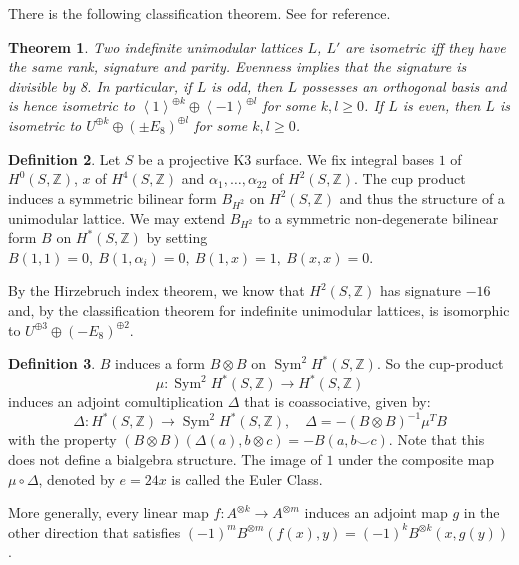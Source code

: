 \documentclass{amsart}
\DeclareMathOperator{\Sym}{Sym}
\newcommand{\One}{1}
\newcommand{\IZ}{\mathbb{Z}}
\theoremstyle{plain}
\newtheorem{theorem}{Theorem}[section]
\theoremstyle{definition}
\newtheorem{definition}[theorem]{Definition}
\theoremstyle{remark}
\begin{document}
There is the following classification theorem. See \cite[Chap. II]{milnor1973symmetric} for reference.
\begin{theorem}
Two indefinite unimodular lattices $L$, $L'$ are isometric iff they have the same rank, signature and parity. Evenness implies that the signature is divisible by 8. 
In particular, if $L$ is odd, then $L$ possesses an orthogonal basis and is hence isometric to $\left<1\right>^{\oplus k}\oplus\left<-1\right>^{\oplus l}$ for some $k,l\geq 0$. If $L$ is even, then $L$ is isometric to $U^{\oplus k}\oplus (\pm E_8)^{\oplus l}$ for some $k,l\geq 0$.
\end{theorem}
\begin{definition}
Let $S$ be a projective K3 surface. We fix integral bases $\One$ of $H^0(S,\IZ)$, $x$ of $H^4(S,\IZ)$ and $\alpha_1,\ldots ,\alpha_{22}$ of $H^2(S,\IZ)$. The cup product induces a symmetric bilinear form $B_{H^2}$ on $H^2(S,\IZ)$ and thus the structure of a unimodular lattice.
We may extend $B_{H^2}$ to a symmetric non-degenerate bilinear form $B$ on $H^\ast(S,\IZ)$ by setting $ B(\One,\One) = 0,\ B(\One,\alpha_i) = 0,\ B(\One,x) = 1, \ B(x,x) = 0$.
\end{definition}
By the Hirzebruch index theorem, we know that $H^2(S,\IZ)$ has signature $-16$ and, by the classification theorem for indefinite unimodular lattices, is isomorphic to $U^{\oplus 3}\oplus (-E_8)^{\oplus 2}$.
\begin{definition}\label{comult}
$B$ induces a form $B\otimes B$ on $\Sym^2H^\ast(S,\IZ)$. So the cup-product 
\begin{equation*}
\mu : \Sym ^2H^{*}(S,\IZ) \longrightarrow H^\ast(S,\IZ) 
\end{equation*}
induces an adjoint comultiplication $\Delta$ that is coassociative, given by:
\begin{equation*}
\Delta : H^\ast(S,\IZ) \longrightarrow \Sym^2H^\ast(S,\IZ),\quad \Delta = -(B\otimes B)^{-1}\mu^TB
\end{equation*}
with the property $(B\otimes B)\left(\Delta(a),b\otimes c\right)=-B\left(a,b\smile c\right)$. Note that this does not define a bialgebra structure.
The image of $\One$ under the composite map $\mu\circ\Delta$, denoted by $e=24x$ is called the Euler Class.

More generally, every linear map $f: A^{\otimes k} \rightarrow A^{\otimes m}$ induces an adjoint map $g$ in the other direction that satisfies $(-1)^mB^{\otimes m}(f(x),y)= (-1)^{k} B^{\otimes k}(x,g(y))$.
\end{definition}
\end{document}
